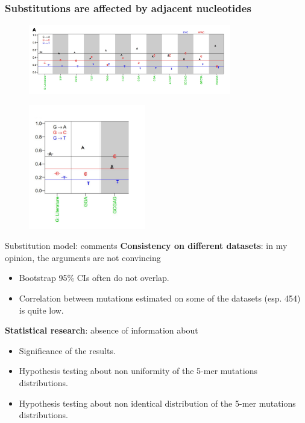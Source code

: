 \documentclass{beamer}\usepackage[]{graphicx}\usepackage[]{color}
\begin{document}
\begin{frame}
  \frametitle{Substitutions are affected by adjacent nucleotides}
  \begin{figure}[h]
    \center\includegraphics[width=250pt]{Pictures/substitution_adj_nucl.jpg}
 \end{figure}
  \begin{figure}[h]
    \center\includegraphics[width=145pt]{Pictures/substitution_adj_nucl.png}
 \end{figure}
\end{frame}

\begin{frame}{Substitution model: comments}
    \textbf{Consistency on different datasets}: in my opinion, the arguments are not convincing
    \begin{itemize}
        \item Bootstrap 95\% CIs often do not overlap.
        \item Correlation between mutations estimated on some of the datasets (esp. 454) is quite low.
    \end{itemize}
    \textbf{Statistical research}: absence of information about
    \begin{itemize}
        \item Significance of the results.
        \item Hypothesis testing about non uniformity of the 5-mer mutations distributions.
        \item Hypothesis testing about non identical distribution of the 5-mer mutations distributions.
    \end{itemize}
\end{frame}
\end{document}
